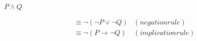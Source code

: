 

$P \land Q$

\begin{align*}
  &\equiv \neg(\neg P \lor \neg Q) &(negation rule)\\
  &\equiv \neg(P \rightarrow \neg Q) &(implication rule)
\end{align*}
